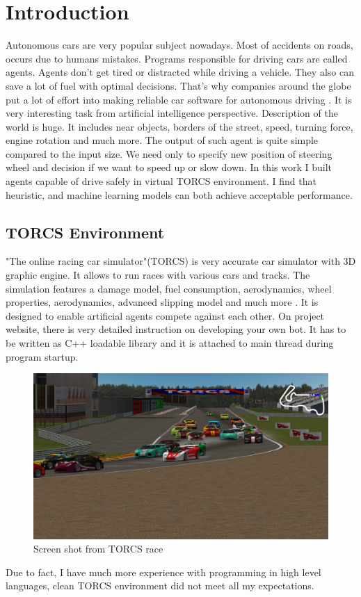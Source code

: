 \documentclass[declaration,shortabstract,english,inz]{iithesis}
\author         {Kacper Kulczak}
\begin{document}


\chapter{Introduction}

Autonomous cars are very popular subject nowadays.
Most of accidents on roads, occurs due to humans mistakes.
Programs responsible for driving cars are called agents.
Agents don't get tired or distracted while driving a vehicle.
They also can save a lot of fuel with optimal decisions.
That's why companies around the globe put a lot of effort into making reliable car software for autonomous driving \cite{autonomus_driving}.
It is very interesting task from artificial intelligence perspective. Description of the world is huge.
It includes near objects, borders of the street, speed, turning force, engine rotation and much more.
The output of such agent is quite simple compared to the input size.
We need only to specify new position of steering wheel and decision if we want to speed up or slow down.
In this work  I built agents  capable of drive safely in virtual TORCS environment. I find that heuristic, and machine learning models can both achieve acceptable performance.



\section{TORCS Environment}
"The online racing car simulator"(TORCS) is very accurate car simulator with 3D graphic engine.
It allows to run races with various cars and tracks.
The simulation features a damage model, fuel consumption, aerodynamics, wheel properties, aerodynamics, advanced slipping model and much more \cite{TORCS}.
It is designed to enable artificial agents compete against each other.
On project website, there is very detailed instruction on developing your own bot.
It has to be written as C++ loadable library and it is attached to main thread during program startup.


\begin{figure}[h]
    \includegraphics[width=\linewidth]{img/torcs_look.jpeg}
    \caption{Screen shot from TORCS race \cite{TORCS}}
    \label{fig:torcs}
\end{figure}
Due to fact, I have much more experience with programming in high level languages, clean TORCS environment did not meet all my expectations. 
\end{document}
